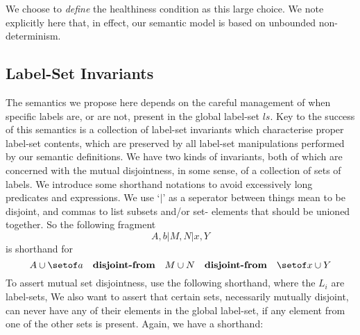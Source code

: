 We choose to \emph{define} the healthiness condition as
this large choice.
We note explicitly here that, in effect, our semantic model is based on
unbounded non-determinism.


\subsection{Label-Set Invariants}


The semantics we propose here depends on the careful management
of when specific labels are, or are not,
present in the global label-set $ls$.
Key to the success of this semantics is a collection of label-set invariants
which characterise proper label-set contents,
which are preserved by all label-set manipulations performed
by our semantic definitions.
We have two kinds of invariants,
both of which are concerned with the mutual disjointness, in some sense,
of a collection of sets of labels.
We introduce some shorthand notations to avoid excessively long predicates and expressions. We use `$\mid$' as a seperator between things mean to be disjoint,
and commas to list subsets and/or set- elements that should be unioned together.
So the following fragment
\[  A,b | M,N | x,Y \]
is shorthand for
\[ A \cup \setof a
  \quad \textbf{disjoint-from} \quad
  M \cup N
  \quad \textbf{disjoint-from} \quad
 \setof x \cup Y
\]
To assert mutual set disjointness,
use the following shorthand, where the $L_i$ are label-sets,
We also want to assert that certain sets, necessarily mutually disjoint,
can never have any of their elements in the global label-set,
if any element from one of the other sets is present.
Again, we have a shorthand:

